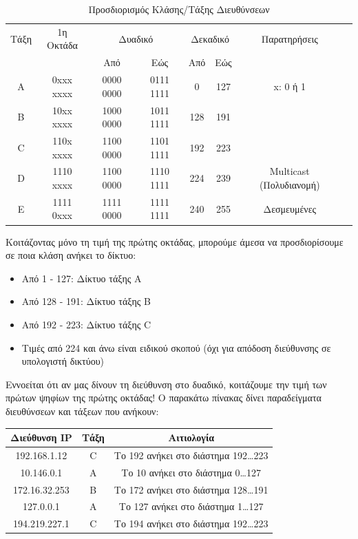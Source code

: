\begin{table}
\centering
  \begin{tabular}{|c|c|c|c|c|c|c|c|}
    \rowcolor[gray]{0.95}
    \hline
    \multirow{2}{*}{} Τάξη & 1η Οκτάδα & \multicolumn{2}{|c|}{Δυαδικό} & \multicolumn{2}{|c|}{Δεκαδικό} & Παρατηρήσεις \\ 
    \cline{3-6}
     \rowcolor[gray]{0.95}
    & & Από & Εώς & Από & Εώς & \\
    \hline
    A & 0xxx xxxx & 0000 0000 & 0111 1111 & 0 & 127 & x: 0 ή 1\\
    \hline
    Β & 10xx xxxx & 1000 0000 & 1011 1111 & 128 & 191 & \\
    \hline
    C & 110x xxxx & 1100 0000 & 1101 1111 & 192 & 223 & \\
    \hline
    D & 1110 xxxx & 1100 0000 & 1110 1111 & 224 & 239 & Multicast (Πολυδιανομή) \\
    \hline
    E & 1111 0xxx & 1111 0000 & 1111 1111 & 240 & 255 & Δεσμευμένες\\
    \hline 
  \end{tabular}
  
\caption{Προσδιορισμός Κλάσης/Τάξης Διευθύνσεων}
\label{t3-1-2}
\end{table}

Κοιτάζοντας μόνο τη τιμή της πρώτης οκτάδας, μπορούμε άμεσα να προσδιορίσουμε σε ποια κλάση ανήκει το δίκτυο:

\begin{itemize}
\item Από 1 - 127: Δίκτυο τάξης Α
\item Από 128 - 191: Δίκτυο τάξης B
\item Από 192 - 223: Δίκτυο τάξης C
\item Τιμές από 224 και άνω είναι ειδικού σκοπού (όχι για απόδοση διεύθυνσης σε υπολογιστή δικτύου)
\end{itemize}

Εννοείται ότι αν μας δίνουν τη διεύθυνση στο δυαδικό, κοιτάζουμε την τιμή των πρώτων ψηφίων της πρώτης οκτάδας!
Ο παρακάτω πίνακας δίνει παραδείγματα διευθύνσεων και τάξεων που ανήκουν:

\begin{center}
\begin{tabular}{|c|c|c|}
\hline
\rowcolor[gray]{0.95}
Διεύθυνση IP & Τάξη & Αιτιολογία \\
\hline
192.168.1.12 & C & Το 192 ανήκει στο διάστημα 192\ldots223\\
\hline
10.146.0.1 & A & Το 10 ανήκει στο διάστημα 0\ldots127\\
\hline
172.16.32.253 & B & Το 172 ανήκει στο διάστημα 128\ldots191\\
\hline
127.0.0.1 & A & Το 127 ανήκει στο διάστημα 1\ldots127\\
\hline
194.219.227.1 & C & Το 194 ανήκει στο διάστημα 192\ldots223\\
\hline
\end{tabular}
\end{center}

